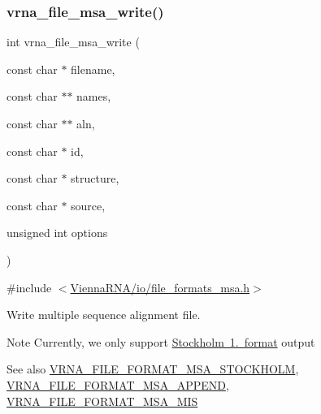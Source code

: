 \subsubsection{\texorpdfstring{vrna\_file\_msa\_write()}{vrna\_file\_msa\_write()}}
{\footnotesize\ttfamily int vrna\+\_\+file\+\_\+msa\+\_\+write (\begin{DoxyParamCaption}\item[{const char $\ast$}]{filename,  }\item[{const char $\ast$$\ast$}]{names,  }\item[{const char $\ast$$\ast$}]{aln,  }\item[{const char $\ast$}]{id,  }\item[{const char $\ast$}]{structure,  }\item[{const char $\ast$}]{source,  }\item[{unsigned int}]{options }\end{DoxyParamCaption})}



{\ttfamily \#include $<$\mbox{\hyperlink{io_2file__formats__msa_8h}{Vienna\+R\+N\+A/io/file\+\_\+formats\+\_\+msa.\+h}}$>$}



Write multiple sequence alignment file. 

\begin{DoxyNote}{Note}
Currently, we only support \mbox{\hyperlink{file_formats_msa-formats-stockholm}{Stockholm 1. format}} output
\end{DoxyNote}
\begin{DoxySeeAlso}{See also}
\mbox{\hyperlink{group__file__formats__msa_ga62be992445cd8ab2ad7a8fded944338b}{V\+R\+N\+A\+\_\+\+F\+I\+L\+E\+\_\+\+F\+O\+R\+M\+A\+T\+\_\+\+M\+S\+A\+\_\+\+S\+T\+O\+C\+K\+H\+O\+LM}}, \mbox{\hyperlink{group__file__formats__msa_ga1577ea0f497d9c501549c863a4f2c089}{V\+R\+N\+A\+\_\+\+F\+I\+L\+E\+\_\+\+F\+O\+R\+M\+A\+T\+\_\+\+M\+S\+A\+\_\+\+A\+P\+P\+E\+ND}}, \mbox{\hyperlink{group__file__formats__msa_ga494488a771aa0c602fb4cf445be34d47}{V\+R\+N\+A\+\_\+\+F\+I\+L\+E\+\_\+\+F\+O\+R\+M\+A\+T\+\_\+\+M\+S\+A\+\_\+\+M\+IS}}
\end{DoxySeeAlso}


